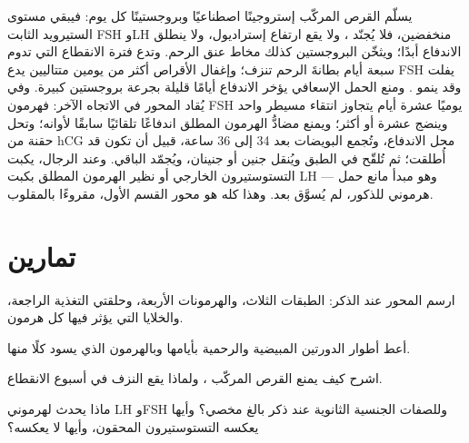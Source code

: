 \begin{proposition}\label{prop:b2:reproductive-hormones:clinic}
يسلّم القرص المركّب إستروجينًا اصطناعيًا وبروجستينًا
كل يوم: فيبقي مستوى الستيرويد الثابت FSH وLH منخفضين، فلا
يُجنّد ، ولا يقع ارتفاع إستراديول، ولا ينطلق الاندفاع
أبدًا؛ ويثخّن البروجستين كذلك مخاط عنق الرحم. وتدع
فترة الانقطاع التي تدوم سبعة أيام بطانةَ الرحم تنزف؛ وإغفال الأقراص أكثر
من يومين متتاليين يدع FSH يفلت وقد ينمو .
ومنع الحمل الإسعافي يؤخر الاندفاع أيامًا قليلة بجرعة
بروجستين كبيرة. وفي \emph{} يُقاد المحور
في الاتجاه الآخر: فهرمون FSH يوميًا عشرة أيام يتجاوز
انتقاء  مسيطر واحد وينضج عشرة أو أكثر؛ ويمنع
مضادُّ الهرمون المطلق اندفاعًا تلقائيًا سابقًا لأوانه؛ وتحل حقنة
من hCG محل الاندفاع، وتُجمع البويضات بعد 34
إلى 36 ساعة، قبيل أن تكون قد أُطلقت؛ ثم
تُلقّح في الطبق ويُنقل جنين أو جنينان،
ويُجمّد الباقي. وعند الرجال، يكبت التستوستيرون الخارجي أو نظير
الهرمون المطلق  بكبت LH --- وهو مبدأ
مانع حمل هرموني للذكور، لم يُسوَّق بعد. وهذا كله هو
محور القسم الأول، مقروءًا بالمقلوب.
\end{proposition}

\section{تمارين}

\begin{exercise}[$\star$]\label{exo:b2:reproductive-hormones:1}
ارسم المحور عند الذكر: الطبقات الثلاث، والهرمونات الأربعة،
وحلقتي التغذية الراجعة، والخلايا التي يؤثر فيها كل هرمون.
\end{exercise}

\begin{exercise}[$\star$]\label{exo:b2:reproductive-hormones:2}
أعط أطوار الدورتين المبيضية والرحمية بأيامها
وبالهرمون الذي يسود كلًا منها.
\end{exercise}

\begin{exercise}[$\star$]\label{exo:b2:reproductive-hormones:3}
اشرح كيف يمنع القرص المركّب ، ولماذا يقع النزف
في أسبوع الانقطاع.
\end{exercise}

\begin{exercise}[$\star$]\label{exo:b2:reproductive-hormones:4}
ماذا يحدث لهرموني LH وFSH وللصفات الجنسية الثانوية عند
ذكر بالغ مخصي؟ وأيها يعكسه التستوستيرون المحقون،
وأيها لا يعكسه؟
\end{exercise}

